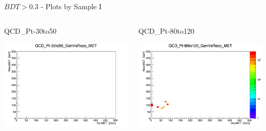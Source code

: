 \documentclass[8pt]{beamer}
\begin{document}
\begin{frame}{$BDT>0.3$ - Plots by Sample I }

\begin{columns}

\begin{block}{QCD\_Pt-30to50}
 
\centering
\includegraphics[width=\linewidth]{img/QCD_Pt-30to50_GenVsReco_MET.png} 
 
\end{block}

\begin{block}{QCD\_Pt-80to120}
 
\centering
\includegraphics[width=\linewidth]{img/QCD_Pt-80to120_GenVsReco_MET.png} 
 
\end{block}



\end{columns}
\end{frame}
\end{document}
